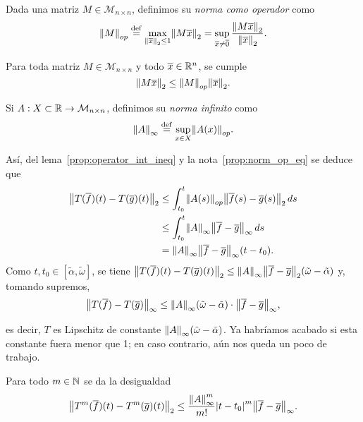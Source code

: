\documentclass[../ecuaciones_diferenciales.tex]{subfiles}
\begin{document}
\begin{definition}
	Dada una matriz \(M \in \mathcal{M}_{n \times n}\), definimos su \emph{norma
	como operador} como
	\[\norm{M}_{op} \assign \max_{\norm{\vec{x}}_2 \leq 1} \norm{M \vec{x}}_2
		= \sup_{\vec{x} \neq \vec{0}}
			\frac{\norm{M \vec{x}}_2}{\norm{\vec{x}}_2}.\]
\end{definition}

\begin{remark} \label{prop:norm_op_eq}
	Para toda matriz \(M \in \mathcal{M}_{n \times n}\) y todo
	\(\overline{x} \in \mathbb{R}^n\), se cumple
	\[\norm{M \vec{x}}_2 \leq \norm{M}_{op} \norm{\vec{x}}_2.\]
\end{remark}

\begin{definition}
	Si \(A : X \subset \mathbb{R} \to \mathcal{M}_{n \times n}\), definimos su \emph{norma
	infinito} como
	\[\norm{A}_\infty \assign \sup_{x \in X} \norm{A(x)}_{op}.\]
\end{definition}

Así, del lema~\ref{prop:operator_int_ineq} y la nota~\ref{prop:norm_op_eq} se
deduce que
\begin{align*}
	\norm{T(\vec{f})(t) - T(\vec{g})(t)}_2
	&\leq \int_{t_0}^t \norm{A(s)}_{op} \norm{\vec{f}(s) - \vec{g}(s)}_2 \dif s
	\\
	&\leq \int_{t_0}^t \norm{A}_\infty \norm{\vec{f} - \vec{g}}_\infty \dif s \\
	&= \norm{A}_\infty\norm{\vec{f} - \vec{g}}_\infty(t - t_0).
\end{align*}
Como \(t, t_0 \in [\tilde{\alpha}, \tilde{\omega}]\), se tiene
\(\norm{T(\vec{f})(t) - T(\vec{g})(t)}_2
	\leq \norm{A}_\infty\norm{\vec{f} - \vec{g}}_2
		(\tilde{\omega} - \tilde{\alpha})\) y, tomando supremos,
\[\norm{T(\vec{f}) - T(\vec{g})}_\infty
	\leq \norm{A}_\infty(\tilde{\omega}
	- \tilde{\alpha}) \cdot \norm{\vec{f} - \vec{g}}_\infty,\]

es decir, \(T\) es Lipschitz de constante
\(\norm{A}_\infty(\tilde{\omega}-\tilde{\alpha})\). Ya habríamos acabado si esta
constante fuera menor que 1; en caso contrario, aún nos queda un poco de
trabajo.

\begin{lemma} \label{lem:desinfty}
	Para todo \(m \in \mathbb{N}\) se da la desigualdad
	\[\norm{T^m(\vec{f})(t) - T^m(\vec{g})(t)}_2
		\leq \frac{\norm{A}^m_\infty}{m!} \abs{t - t_0}^m
			\norm{\vec{f} - \vec{g}}_\infty.\]
\end{lemma}
\end{document}
